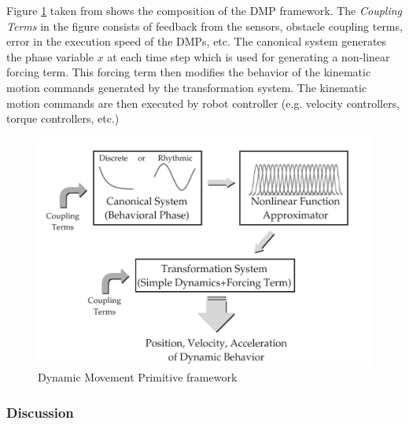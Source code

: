 Figure \ref{fig:DMP_framework} taken from \cite{ijspeert2013dynamical} shows the composition of the DMP framework. The \textit{Coupling Terms} in the figure consists of feedback from the sensors, obstacle coupling terms, error in the execution speed of the DMPs, etc. The canonical system generates the phase variable $x$ at each time step which is used for generating a non-linear forcing term. This forcing term then modifies the behavior of the kinematic motion commands generated by the transformation system. The kinematic motion commands are then executed by robot controller (e.g. velocity controllers, torque controllers, etc.)

\begin{figure}[H]
	\includegraphics[width=\textwidth]{images/dmp.png}
	\caption{Dynamic Movement Primitive framework \cite{ijspeert2013dynamical}}
	\label{fig:DMP_framework}
\end{figure}
 
\subsubsection{Discussion}

